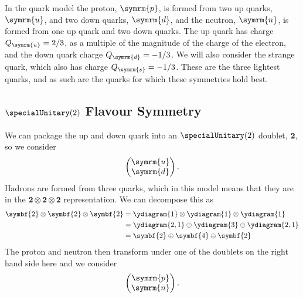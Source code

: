 \documentclass[fleqn]{NotesClass}
\newcommand{\Pparticle}[1]{\symrm{#1}}
\newcommand{\Pp}{\ensuremath{\Pparticle{p}}}
\newcommand{\Pn}{\ensuremath{\Pparticle{n}}}
\newcommand{\Pu}{\ensuremath{\Pparticle{u}}}
\newcommand{\Pd}{\ensuremath{\Pparticle{d}}}
\newcommand{\Ps}{\ensuremath{\Pparticle{s}}}
\newcommand{\rep}[1]{\symbf{#1}}
\begin{document}
    In the quark model the proton, \(\Pp\), is formed from two up quarks, \(\Pu\), and two down quarks, \(\Pd\), and the neutron, \(\Pn\), is formed from one up quark and two down quarks.
    The up quark has charge \(Q_{\Pu} = 2/3\), as a multiple of the magnitude of the charge of the electron, and the down quark charge \(Q_{\Pd} = -1/3\).
    We will also consider the strange quark, which also has charge \(Q_{\Ps} = -1/3\).
    These are the three lightest quarks, and as such are the quarks for which these symmetries hold best.
    
    \subsection{\texorpdfstring{\(\specialUnitary(2)\)}{SU(2)} Flavour Symmetry}
    We can package the up and down quark into an \(\specialUnitary(2)\) doublet, \(\rep{2}\), so we consider
    \begin{equation}
        \begin{pmatrix}
            \Pu\\ \Pd
        \end{pmatrix}
        .
    \end{equation}
    Hadrons are formed from three quarks, which in this model means that they are in the \(\rep{2} \otimes \rep{2} \otimes \rep{2}\) representation.
    We can decompose this as
    \begin{align}
        \rep{2} \otimes \rep{2} \otimes \rep{2} &= \ydiagram{1} \otimes \ydiagram{1} \otimes \ydiagram{1}\\
        &= \ydiagram{2,1} \oplus \ydiagram{3} \oplus \ydiagram{2,1}\\
        &= \rep{2} \oplus \rep{4} \oplus \rep{2}
    \end{align}
    The proton and neutron then transform under one of the doublets on the right hand side here and we consider
    \begin{equation}
        \begin{pmatrix}
            \Pp\\ \Pn
        \end{pmatrix}
        .
    \end{equation}
    
\end{document}
